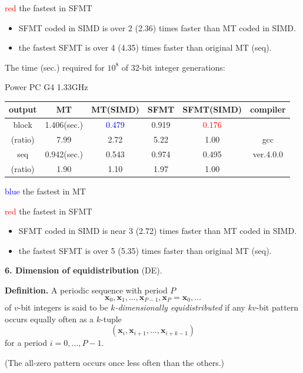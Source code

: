 \documentclass[a4j,12pt,landscape]{jarticle}
\def\bx{{{\mathbf x}}}
\begin{document}
\textcolor{red}{red} the fastest in SFMT
\begin{itemize}
  \item SFMT coded in SIMD is over 2 (2.36) times faster than MT
 coded in SIMD.
  \item the fastest SFMT is over 4 (4.35) times faster than original MT (seq).
\end{itemize}

\newpage
\begin{center}
The time (sec.) required for $10^8$ 
of 32-bit integer generations:

Power PC G4 1.33GHz

\vskip 2mm
\begin{tabular}{|c||c|c|c|c|c|}
\hline
output & MT & MT{\Large(SIMD)} & SFMT & SFMT{\Large (SIMD)} & compiler
\\ \hline \hline
block &1.406(sec.) & \textcolor{blue}{0.479}
 & 0.919 & \textcolor{red}{0.176} & \phantom{intel C/C++}\\ \cline{2-5}
(ratio)& 7.99\phantom{0} & 2.72\phantom{0}  & 5.22\phantom{0} & 1.00\phantom{0} & gcc \\ \cline{1-5}
 seq & 0.942(sec.) & 0.543 & 0.974 & 0.495 & ver.4.0.0 \\ \cline{2-5}
(ratio)& 1.90\phantom{0} & 1.10\phantom{0} & 1.97\phantom{0} & 1.00\phantom{0} & \\ \hline
\end{tabular}
\end{center}
\textcolor{blue}{blue} the fastest in MT

\textcolor{red}{red} the fastest in SFMT
\begin{itemize}
  \item SFMT coded in SIMD is near 3 (2.72) times faster than MT
 coded in SIMD.
  \item the fastest SFMT is over 5 (5.35) times faster than original MT (seq).
\end{itemize}

\newpage
\noindent
{\bf 6. Dimension of equidistribution} (DE).

{\bf Definition.} 
A periodic sequence with period $P$
$$\bx_0, \bx_1, \ldots, \bx_{P-1}, \bx_P=\bx_0, \ldots$$
of $v$-bit integers is said to be {\em $k$-dimensionally equidistributed}
if any $kv$-bit pattern occurs equally often as a $k$-tuple
$$
(\bx_i, \bx_{i+1}, \ldots, \bx_{i+k-1})
$$
for a period $i=0,\ldots, P-1$. 

(The all-zero pattern occurs once less often than the others.)
\end{document}
